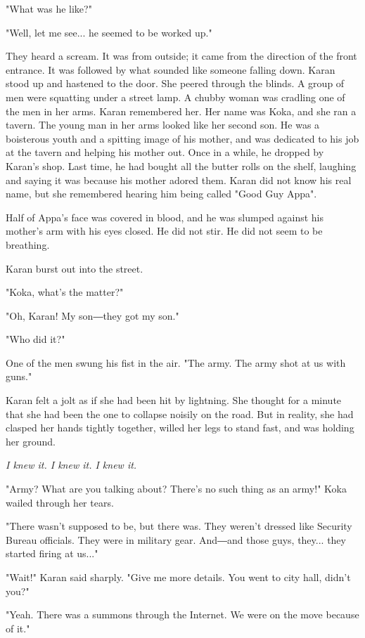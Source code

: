 "What was he like?"

"Well, let me see... he seemed to be worked up."

They heard a scream. It was from outside; it came from the direction of
the front entrance. It was followed by what sounded like someone falling
down. Karan stood up and hastened to the door. She peered through the
blinds. A group of men were squatting under a street lamp. A chubby
woman was cradling one of the men in her arms. Karan remembered her. Her
name was Koka, and she ran a tavern. The young man in her arms looked
like her second son. He was a boisterous youth and a spitting image of
his mother, and was dedicated to his job at the tavern and helping his
mother out. Once in a while, he dropped by Karan's shop. Last time, he
had bought all the butter rolls on the shelf, laughing and saying it was
because his mother adored them. Karan did not know his real name, but
she remembered hearing him being called "Good Guy Appa".

Half of Appa's face was covered in blood, and he was slumped against his
mother's arm with his eyes closed. He did not stir. He did not seem to
be breathing.

Karan burst out into the street.

"Koka, what's the matter?"

"Oh, Karan! My son―they got my son."

"Who did it?"

One of the men swung his fist in the air. "The army. The army shot at us
with guns."

Karan felt a jolt as if she had been hit by lightning. She thought for a
minute that she had been the one to collapse noisily on the road. But in
reality, she had clasped her hands tightly together, willed her legs to
stand fast, and was holding her ground.

\emph{I knew it. I knew it. I knew it.}

"Army? What are you talking about? There's no such thing as an army!"
Koka wailed through her tears.

"There wasn't supposed to be, but there was. They weren't dressed like
Security Bureau officials. They were in military gear. And―and those
guys, they... they started firing at us..."

"Wait!" Karan said sharply. "Give me more details. You went to city
hall, didn't you?"

"Yeah. There was a summons through the Internet. We were on the move
because of it."

